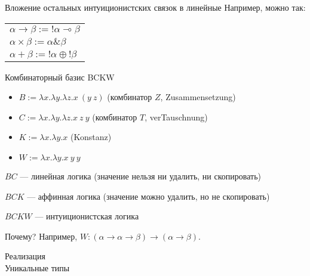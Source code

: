 \documentclass[aspectratio=169,dvipsnames,usenames]{beamer}
\begin{document}
\begin{frame}{Вложение остальных интуиционистских связок в линейные}
Например, можно так:
\begin{center}\begin{tabular}{l}
$\alpha\rightarrow\beta := !\alpha\multimap\beta$\\
$\alpha\times\beta := \alpha\&\beta$\\
$\alpha+\beta := !\alpha\oplus!\beta$
\end{tabular}\end{center}

\end{frame}

\begin{frame}{Комбинаторный базис BCKW}

\begin{itemize}
\item $B := \lambda x.\lambda y.\lambda z.x\ (y\ z)$ (комбинатор $Z$, Zusammensetzung)
\item $C := \lambda x.\lambda y.\lambda z.x\ z\ y$ (комбинатор $T$, verTauschnung)
\item $K := \lambda x.\lambda y.x$ (Konstanz)
\item $W := \lambda x.\lambda y.x\ y\ y$
\end{itemize}
$BC$ --- линейная логика (значение нельзя ни удалить, ни скопировать)

$BCK$ --- аффинная логика (значение можно удалить, но не скопировать)

$BCKW$ --- интуиционистская логика
\vspace{1cm}

Почему? Например, $W:(\alpha\rightarrow\alpha\rightarrow\beta)\rightarrow(\alpha\rightarrow\beta)$.

\end{frame}

\begin{frame}{}
\begin{center}
{\LARGE Реализация\\Уникальные типы}
\end{center}
\end{frame}
\end{document}
